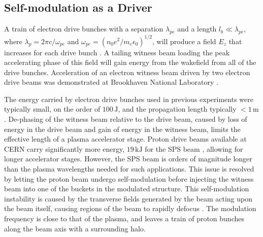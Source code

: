 \documentclass[aps,prstab,reprint,amsmath,amssymb,groupedaddress]{revtex4-1}
\newcommand{\unit}[1]{\,\mathrm{#1}}
\begin{document}
\subsection[\label{S:I:SMI}]{Self-modulation as a Driver}

A train of electron drive bunches with a separation $\lambda_{pe}$ and a length $l_{b} \ll \lambda_{pe}$, where
$\lambda_{p} = 2\pi c/\omega_{pe}$ and $\omega_{pe} = (n_{0} e^{2} / m_{e} \epsilon_{0})^{1/2}$,
will produce a field $E_{z}$ that increases for each drive bunch \cite{chen:1985}. A tailing witness beam loading the
peak accelerating phase of this field will gain energy from the wakefield from all of the drive bunches. Acceleration of
an electron witness beam driven by two electron drive beams was demonstrated at Brookhaven National Laboratory
\cite{muggli:2011}.

The energy carried by electron drive bunches used in previous experiments were typically small, on the order of
$100\unit{J}$, and the propagation length typically $<1\unit{m}$ \cite{blumenfeld:2007,caldwell:2009}. De-phasing of the
witness beam relative to the drive beam, caused by loss of energy in the drive beam and gain of energy in the witness
beam, limits the effective length of a plasma accelerator stage. Proton drive beams available at CERN carry
significantly more energy, $19\unit{kJ}$ for the SPS beam \cite{gschwendtner:2016}, allowing for longer accelerator
stages. However, the SPS beam is orders of magnitude longer than the plasma wavelengths needed for such applications.
This issue is resolved by letting the proton beam undergo self-modulation before injecting the witness beam into one of
the buckets in the modulated structure. This self-modulation instability is caused by the transverse fields generated by
the beam acting upon the beam itself, causing regions of the beam to rapidly defocus \cite{kumar:2010}. The modulation
frequency is close to that of the plasma, and leaves a train of proton bunches along the beam axis with a surrounding
halo.
\end{document}
